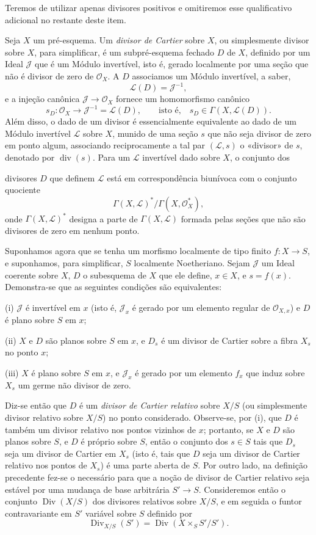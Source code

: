 \documentclass[11pt,twoside,openany]{book}
\numberwithin{equation}{section}
\newcommand{\src}[1]{%
  \phantomsection\hypertarget{src:#1}{}%
  \marginpar{\raggedleft\footnotesize\sffamily #1}%
}
\theoremstyle{plain}
\theoremstyle{definition}
\theoremstyle{remark}
\newcommand{\FgaUnitKey}{frontmatter}
\renewcommand{\src}[1]{%
  \phantomsection\hypertarget{src:\FgaUnitKey:#1}{}%
  \marginpar{\raggedleft\footnotesize\sffamily #1}%
}
\begin{document}
Teremos de utilizar apenas divisores positivos e omitiremos esse qualificativo
adicional no restante deste item.

Seja $X$ um pré-esquema. Um \emph{divisor de Cartier} sobre $X$, ou simplesmente
divisor sobre $X$, para simplificar, é um subpré-esquema fechado $D$ de $X$,
definido por um Ideal $\mathcal J$ que é um Módulo invertível, isto é, gerado
localmente por uma seção que não é divisor de zero de $\mathcal O_X$. A $D$
associamos um Módulo invertível, a saber,
\[
\mathcal L(D)=\mathcal J^{-1},
\]
e a injeção canônica $\mathcal J\longrightarrow\mathcal O_X$ fornece um
homomorfismo canônico
\[
s_D:\mathcal O_X\longrightarrow\mathcal J^{-1}=\mathcal L(D),
\qquad\text{isto é,}\quad s_D\in\Gamma(X,\mathcal L(D)).
\]
Além disso, o dado de um divisor é essencialmente equivalente ao dado de um
Módulo invertível $\mathcal L$ sobre $X$, munido de uma seção $s$ que não seja
divisor de zero em ponto algum, associando reciprocamente a tal par
$(\mathcal L,s)$ o «divisor» de $s$, denotado por $\operatorname{div}(s)$. Para
um $\mathcal L$ invertível dado sobre $X$, o conjunto dos
\src{151}
divisores $D$ que definem $\mathcal L$ está em correspondência biunívoca com o
conjunto quociente
\[
\Gamma(X,\mathcal L)^*/\Gamma(X,\mathcal O_X^*),
\]
onde $\Gamma(X,\mathcal L)^*$ designa a parte de $\Gamma(X,\mathcal L)$ formada
pelas seções que não são divisores de zero em nenhum ponto.

Suponhamos agora que se tenha um morfismo localmente de tipo finito
$f:X\longrightarrow S$, e suponhamos, para simplificar, $S$ localmente
Noetheriano. Sejam $\mathcal J$ um Ideal coerente sobre $X$, $D$ o subesquema de
$X$ que ele define, $x\in X$, e $s=f(x)$. Demonstra-se que as seguintes
condições são equivalentes:

\noindent (i) $\mathcal J$ é invertível em $x$ (isto é, $\mathcal J_x$ é gerado
por um elemento regular de $\mathcal O_{X,x}$) e $D$ é plano sobre $S$ em $x$;

\noindent (ii) $X$ e $D$ são planos sobre $S$ em $x$, e $D_s$ é um divisor de
Cartier sobre a fibra $X_s$ no ponto $x$;

\noindent (iii) $X$ é plano sobre $S$ em $x$, e $\mathcal J_x$ é gerado por um
elemento $f_x$ que induz sobre $X_s$ um germe não divisor de zero.

Diz-se então que $D$ é um \emph{divisor de Cartier relativo} sobre $X/S$ (ou
simplesmente divisor relativo sobre $X/S$) no ponto considerado. Observe-se, por
(i), que $D$ é também um divisor relativo nos pontos vizinhos de $x$; portanto,
se $X$ e $D$ são planos sobre $S$, e $D$ é próprio sobre $S$, então o conjunto
dos $s\in S$ tais que $D_s$ seja um divisor de Cartier em $X_s$ (isto é, tais
que $D$ seja um divisor de Cartier relativo nos pontos de $X_s$) é uma parte
aberta de $S$. Por outro lado, na definição precedente fez-se o necessário para
que a noção de divisor de Cartier relativo seja estável por uma mudança de base
arbitrária $S'\longrightarrow S$. Consideremos então o conjunto
$\operatorname{Div}(X/S)$ dos divisores relativos sobre $X/S$, e em seguida o
funtor contravariante em $S'$ variável sobre $S$ definido por
\[
\operatorname{Div}_{X/S}(S')=
\operatorname{Div}(X\times_SS'/S').
\]
\end{document}
